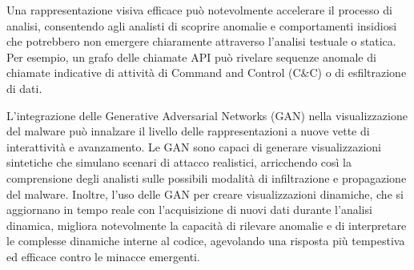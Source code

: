Una rappresentazione visiva efficace può notevolmente accelerare il processo di analisi, consentendo agli analisti di scoprire anomalie e comportamenti insidiosi che potrebbero non emergere chiaramente attraverso l'analisi testuale o statica. Per esempio, un grafo delle chiamate API può rivelare sequenze anomale di chiamate indicative di attività di Command and Control (C\&C) o di esfiltrazione di dati.

L'integrazione delle Generative Adversarial Networks (GAN) nella visualizzazione del malware può innalzare il livello delle rappresentazioni a nuove vette di interattività e avanzamento. Le GAN sono capaci di generare visualizzazioni sintetiche che simulano scenari di attacco realistici, arricchendo così la comprensione degli analisti sulle possibili modalità di infiltrazione e propagazione del malware. Inoltre, l'uso delle GAN per creare visualizzazioni dinamiche, che si aggiornano in tempo reale con l'acquisizione di nuovi dati durante l'analisi dinamica, migliora notevolmente la capacità di rilevare anomalie e di interpretare le complesse dinamiche interne al codice, agevolando una risposta più tempestiva ed efficace contro le minacce emergenti.
\newpage
